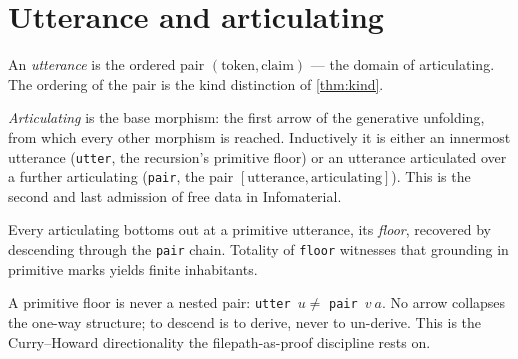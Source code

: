 \section{Utterance and articulating}

\begin{definition}[Utterance]
  \label{def:utterance}
  \leanok
  An \emph{utterance} is the ordered pair $(\text{token}, \text{claim})$ ---
  the domain of articulating. The ordering of the pair is the kind distinction
  of \cref{thm:kind}.
\end{definition}

\begin{definition}[Articulating]
  \label{def:articulating}
  \leanok
  \emph{Articulating} is the base morphism: the first arrow of the generative
  unfolding, from which every other morphism is reached. Inductively it is
  either an innermost utterance (\texttt{utter}, the recursion's primitive
  floor) or an utterance articulated over a further articulating
  (\texttt{pair}, the pair $[\text{utterance}, \text{articulating}]$). This is
  the second and last admission of free data in Infomaterial.
\end{definition}

\begin{proposition}[Floor]
  \label{thm:floor}
  \leanok
  Every articulating bottoms out at a primitive utterance, its \emph{floor},
  recovered by descending through the \texttt{pair} chain. Totality of
  \texttt{floor} witnesses that grounding in primitive marks yields finite
  inhabitants.
\end{proposition}

\begin{lemma}
  \label{lem:articulating-oneway}
  \leanok
  A primitive floor is never a nested pair:
  \texttt{utter}~$u \neq$ \texttt{pair}~$v~a$. No arrow collapses the one-way
  structure; to descend is to derive, never to un-derive. This is the
  Curry--Howard directionality the filepath-as-proof discipline rests on.
\end{lemma}
